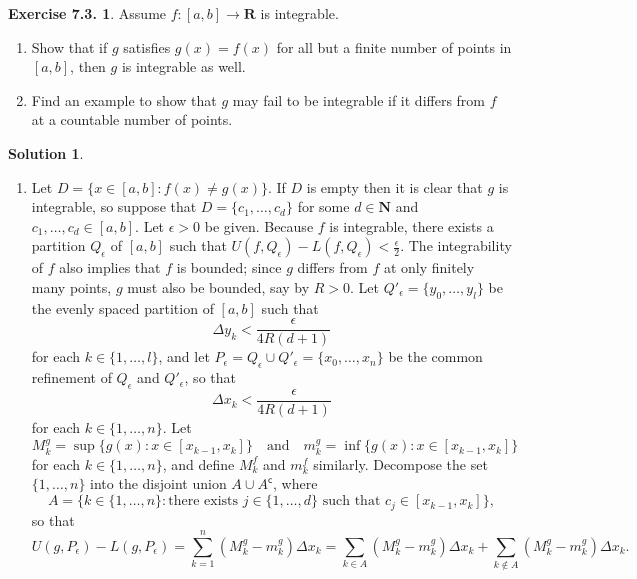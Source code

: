 \documentclass[12pt]{article}
\theoremstyle{definition}
\theoremstyle{exercise}
\newtheorem{exercise}{Exercise 7.3.}
\theoremstyle{solution}
\newtheorem*{solution}{Solution}
\newcommand{\setcomp}[1]{#1^{\mathsf{c}}}
\newcommand{\quand}{\quad \text{and} \quad}
\newcommand{\N}{\mathbf{N}}
\newcommand{\R}{\mathbf{R}}
\begin{document}
\begin{exercise}
\label{ex:7}
    Assume \( f : [a, b] \to \R \) is integrable.
    \begin{enumerate}
        \item Show that if \( g \) satisfies \( g(x) = f(x) \) for all but a finite number of points in \( [a, b] \), then \( g \) is integrable as well.

        \item Find an example to show that \( g \) may fail to be integrable if it differs from \( f \) at a countable number of points.
    \end{enumerate}
\end{exercise}

\begin{solution}
    \begin{enumerate}
        \item Let \( D = \{ x \in [a, b] : f(x) \neq g(x) \} \). If \( D \) is empty then it is clear that \( g \) is integrable, so suppose that \( D = \{ c_1, \ldots, c_d \} \) for some \( d \in \N \) and \( c_1, \ldots, c_d \in [a, b] \). Let \( \epsilon > 0 \) be given. Because \( f \) is integrable, there exists a partition \( Q_{\epsilon} \) of \( [a, b] \) such that \( U(f, Q_{\epsilon}) - L(f, Q_{\epsilon}) < \tfrac{\epsilon}{2} \). The integrability of \( f \) also implies that \( f \) is bounded; since \( g \) differs from \( f \) at only finitely many points, \( g \) must also be bounded, say by \( R > 0 \). Let \( Q'_{\epsilon} = \{ y_0, \ldots, y_l \} \) be the evenly spaced partition of \( [a, b] \) such that
        \[
            \Delta y_k < \frac{\epsilon}{4 R (d + 1)}
        \]
        for each \( k \in \{ 1, \ldots, l \} \), and let \( P_{\epsilon} = Q_{\epsilon} \cup Q'_{\epsilon} = \{ x_0, \ldots, x_n \} \) be the common refinement of \( Q_{\epsilon} \) and \( Q'_{\epsilon} \), so that
        \[
            \Delta x_k < \frac{\epsilon}{4 R (d + 1)}
        \]
        for each \( k \in \{ 1, \ldots, n \} \). Let
        \[
            M^g_k = \sup \{ g(x) : x \in [x_{k-1}, x_k] \} \quand m^g_k = \inf \{ g(x) : x \in [x_{k-1}, x_k] \}
        \]
        for each \( k \in \{ 1, \ldots, n \} \), and define \( M^f_k \) and \( m^f_k \) similarly. Decompose the set \( \{ 1, \ldots, n \} \) into the disjoint union \( A \cup \setcomp{A} \), where
        \[
            A = \{ k \in \{ 1, \ldots, n \} : \text{there exists } j \in \{ 1, \ldots, d \} \text{ such that } c_j \in [x_{k-1}, x_k] \},
        \]
        so that
        \[
            U(g, P_{\epsilon}) - L(g, P_{\epsilon}) = \sum_{k=1}^n (M^g_k - m^g_k) \Delta x_k = \sum_{k \in A} (M^g_k - m^g_k) \Delta x_k + \sum_{k \not\in A} (M^g_k - m^g_k) \Delta x_k. \tag{1}
\]
\end{enumerate}
\end{solution}
\end{document}

